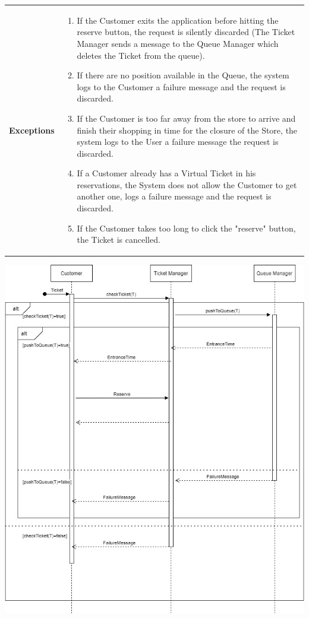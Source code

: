 \documentclass[a4paper, 10pt, oneside]{article}
\begin{document}
\begin{tabularx}{\linewidth}{| l | X |}
	\hline
	\textbf{Exceptions} & \parbox{0.7\textwidth}{ \begin{enumerate}
			\item If the Customer exits the application before hitting the reserve button, the request is silently discarded (The Ticket Manager sends a message to the Queue Manager which deletes the Ticket from the queue).
			\item If there are no position available in the Queue, the system logs to the Customer a failure message and the request is discarded.
			\item If the Customer is too far away from the store to arrive and finish their shopping in time for the closure of the Store, the system logs to the User a failure message the request is discarded.
			\item If a Customer already has a Virtual Ticket in his reservations, the System does not allow the Customer to get another one, logs a failure message and the request is discarded.
			\item If the Customer takes too long to click the "reserve" button, the Ticket is cancelled.
		\end{enumerate}}\\

	\hline
	
\end{tabularx}

\begin{minipage}{\linewidth}
            \centering
           \includegraphics[height=0.5\textheight, scale=1, keepaspectratio]{img/seq_diag/GetTicket.jpg}
\end{minipage}
\end{document}
